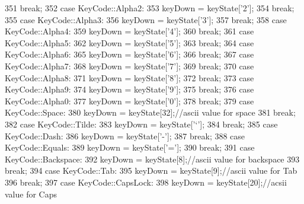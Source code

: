 \begin{DoxyCode}
351         \textcolor{keywordflow}{break};
352     \textcolor{keywordflow}{case} KeyCode::Alpha2:
353         keyDown = keyState[\textcolor{charliteral}{'2'}];
354         \textcolor{keywordflow}{break};
355     \textcolor{keywordflow}{case} KeyCode::Alpha3:
356         keyDown = keyState[\textcolor{charliteral}{'3'}];
357         \textcolor{keywordflow}{break};
358     \textcolor{keywordflow}{case} KeyCode::Alpha4:
359         keyDown = keyState[\textcolor{charliteral}{'4'}];
360         \textcolor{keywordflow}{break};
361     \textcolor{keywordflow}{case} KeyCode::Alpha5:
362         keyDown = keyState[\textcolor{charliteral}{'5'}];
363         \textcolor{keywordflow}{break};
364     \textcolor{keywordflow}{case} KeyCode::Alpha6:
365         keyDown = keyState[\textcolor{charliteral}{'6'}];
366         \textcolor{keywordflow}{break};
367     \textcolor{keywordflow}{case} KeyCode::Alpha7:
368         keyDown = keyState[\textcolor{charliteral}{'7'}];
369         \textcolor{keywordflow}{break};
370     \textcolor{keywordflow}{case} KeyCode::Alpha8:
371         keyDown = keyState[\textcolor{charliteral}{'8'}];
372         \textcolor{keywordflow}{break};
373     \textcolor{keywordflow}{case} KeyCode::Alpha9:
374         keyDown = keyState[\textcolor{charliteral}{'9'}];
375         \textcolor{keywordflow}{break};
376     \textcolor{keywordflow}{case} KeyCode::Alpha0:
377         keyDown = keyState[\textcolor{charliteral}{'0'}];
378         \textcolor{keywordflow}{break};
379     \textcolor{keywordflow}{case} KeyCode::Space:
380         keyDown = keyState[32];\textcolor{comment}{//ascii value for space}
381         \textcolor{keywordflow}{break};
382     \textcolor{keywordflow}{case} KeyCode::Tilde:
383         keyDown = keyState[\textcolor{charliteral}{'`'}];
384         \textcolor{keywordflow}{break};
385     \textcolor{keywordflow}{case} KeyCode::Dash:
386         keyDown = keyState[\textcolor{charliteral}{'-'}];
387         \textcolor{keywordflow}{break};
388     \textcolor{keywordflow}{case} KeyCode::Equals:
389         keyDown = keyState[\textcolor{charliteral}{'='}];
390         \textcolor{keywordflow}{break};
391     \textcolor{keywordflow}{case} KeyCode::Backspace:
392         keyDown = keyState[8];\textcolor{comment}{//ascii value for backspace}
393         \textcolor{keywordflow}{break};
394     \textcolor{keywordflow}{case} KeyCode::Tab:
395         keyDown = keyState[9];\textcolor{comment}{//ascii value for Tab}
396         \textcolor{keywordflow}{break};
397     \textcolor{keywordflow}{case} KeyCode::CapsLock:
398         keyDown = keyState[20];\textcolor{comment}{//acsii value for Caps}

\end{DoxyCode}
